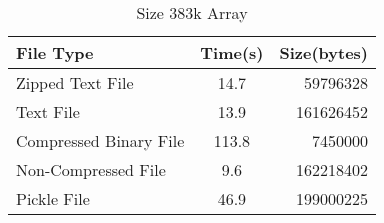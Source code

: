 \begin{table}[h!]
    \begin{center}
        \caption{Size 383k Array}
        \begin{tabular}{l|c|r}
            File Type & Time(s) & Size(bytes)\\
            \hline
            Zipped Text File & 14.7 & 59796328\\
            \hline
            Text File &13.9 & 161626452\\    
            \hline
            Compressed Binary File & 113.8 & 7450000\\
            \hline
            Non-Compressed File & 9.6 &162218402\\
            \hline
            Pickle File & 46.9 & 199000225\\
        \end{tabular}
    \end{center}
\end{table}





